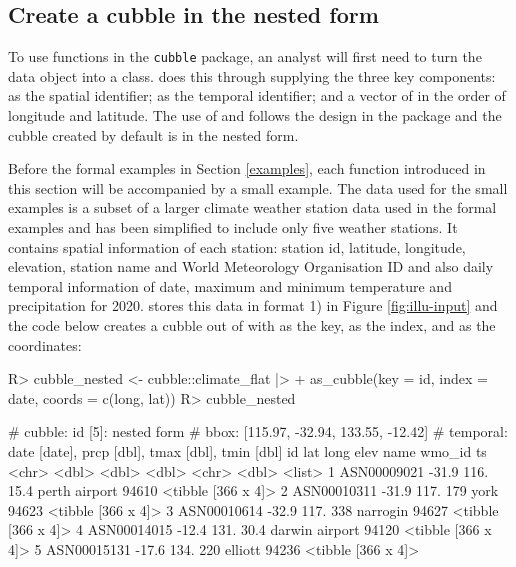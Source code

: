 \documentclass[
]{jss}
\begin{document}
\hypertarget{create-a-cubble-in-the-nested-form}{%
\subsection{Create a cubble in the nested form}\label{create-a-cubble-in-the-nested-form}}

To use functions in the \texttt{cubble} package, an analyst will first need to turn the data object into a  class.  does this through supplying the three key components:  as the spatial identifier;  as the temporal identifier; and a vector of  in the order of longitude and latitude. The use of  and  follows the design in the  package and the cubble created by default is in the nested form.

Before the formal examples in Section \ref{examples}, each function introduced in this section will be accompanied by a small example. The data used for the small examples is a subset of a larger climate weather station data used in the formal examples and has been simplified to include only five weather stations. It contains spatial information of each station: station id, latitude, longitude, elevation, station name and World Meteorology Organisation ID and also daily temporal information of date, maximum and minimum temperature and precipitation for 2020.  stores this data in format 1) in Figure \ref{fig:illu-input} and the code below creates a cubble out of  with  as the key,  as the index, and  as the coordinates:

\begin{CodeChunk}
\begin{CodeInput}
R> cubble_nested <- cubble::climate_flat |>
+   as_cubble(key = id, index = date, coords = c(long, lat))
R> cubble_nested
\end{CodeInput}
\begin{CodeOutput}
# cubble:   id [5]: nested form
# bbox:     [115.97, -32.94, 133.55, -12.42]
# temporal: date [date], prcp [dbl], tmax [dbl], tmin [dbl]
  id            lat  long  elev name           wmo_id ts                
  <chr>       <dbl> <dbl> <dbl> <chr>           <dbl> <list>            
1 ASN00009021 -31.9  116.  15.4 perth airport   94610 <tibble [366 x 4]>
2 ASN00010311 -31.9  117. 179   york            94623 <tibble [366 x 4]>
3 ASN00010614 -32.9  117. 338   narrogin        94627 <tibble [366 x 4]>
4 ASN00014015 -12.4  131.  30.4 darwin airport  94120 <tibble [366 x 4]>
5 ASN00015131 -17.6  134. 220   elliott         94236 <tibble [366 x 4]>
\end{CodeOutput}
\end{CodeChunk}
\end{document}

